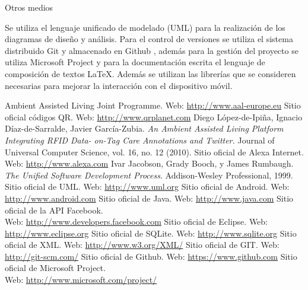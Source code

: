 \documentclass[12pt,a4paper,spanish,oneside]{report}
\makeatletter
\renewcommand{\subsection}{
  \@startsection{subsection}{2}{0mm}{2mm}
  {4.0mm}{\Large\bf}
}
\theoremstyle{plain} \newtheorem{nota}{Nota}
\makeatother
\begin{document}
\subsection{Otros medios}
\begin{spacing}{1.5}
Se utiliza el lenguaje unificado de modelado (UML) \cite{UML} para la 
realización de los diagramas de diseño y análisis. Para el control de versiones
se utiliza el sistema distribuido Git \cite{GIT}y almacenado en Github 
\cite{GITH}, además para la gestión del proyecto se utiliza Microsoft Project 
\cite{MS}  y para la documentación escrita el lenguaje de composición de textos 
\LaTeX{}. Además se utilizan las librerías que se consideren necesarias para
mejorar la interacción con el dispositivo móvil.
\end{spacing}
\begin{thebibliography}{99}
 Ambient Assisted Living Joint Programme. 
Web: \url{http://www.aal-europe.eu}
 Sitio oficial códigos QR. Web: \url{http://www.qrplanet.com}
 Diego López-de-Ipiña, Ignacio Díaz-de-Sarralde, Javier 
García-Zubia. \emph{An Ambient Assisted Living Platform Integrating RFID Data-
on-Tag Care Annotations and Twitter.} Journal of Universal Computer Science, 
vol. 16, no. 12 (2010).
 Sitio oficial de Alexa Internet. Web: \url{http://www.alexa.com}
 Ivar Jacobson, Grady Booch, y James Rumbaugh. \emph{The Unified 
Software Development Process}. Addison-Wesley Professional, 1999.
 Sitio oficial de UML. Web: \url{http://www.uml.org}
 Sitio oficial de Android. Web: \url{http://www.android.com}
 Sitio oficial de Java. Web: \url{http://www.java.com}
 Sitio oficial de la API Facebook. \\
Web: \url{http://www.developers.facebook.com}
 Sitio oficial de Eclipse. Web: \url{http://www.eclipse.org}
 Sitio oficial de SQLite. Web: \url{http://www.sqlite.org}
 Sitio oficial de XML. Web: \url{http://www.w3.org/XML/}
 Sitio oficial de GIT. Web: \url{http://git-scm.com/}
 Sitio oficial de Github. Web: \url{https://www.github.com}
 Sitio oficial de Microsoft Project. \\
Web: \url{http://www.microsoft.com/project/}
\end{thebibliography}
\end{document}
